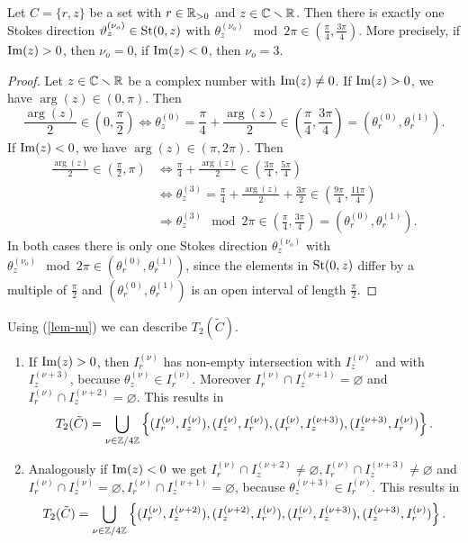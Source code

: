 \begin{lem}\label{lem-nu} Let $C = \{r,z\}$ be a set with $r \in \mathbb{R}_{>0}$ and $z \in \mathbb{C}\smallsetminus \mathbb{R}$. Then there is exactly one Stokes direction $\vartheta_z^{(\nu_o)} \in \operatorname{St}(0,z)$ with $\theta_z^{(\nu_o)}\mod 2 \pi  \in \left( \frac{\pi}{4}, \frac{3\pi}{4} \right)$.
    More precisely, if $\operatorname{Im}(z) > 0$, then $\nu_o = 0$, if $\operatorname{Im}(z)<0$, then  $\nu_o = 3$.
\end{lem}
\begin{proof} Let $z\in \mathbb{C} \smallsetminus \mathbb{R}$ be a complex number with $\operatorname{Im}(z) \neq 0$.
    If $\operatorname{Im}(z)>0$, we have $\arg(z) \in (0,\pi)$. Then 
    \[
    \frac{\arg(z)}{2} \in \left(0, \frac{\pi}{2}\right) \Leftrightarrow \theta_z^{(0)} = \frac{\pi}{4}+\frac{\arg(z)}{2}\in \left(\frac{\pi}{4},\frac{3\pi}{4}\right) = (\theta_r^{(0)}, \theta_r^{(1)}).
    \]
    If $\operatorname{Im}(z)<0$, we have $\arg(z) \in (\pi,2\pi)$. Then 
    \begin{align*}
    \frac{\arg(z)}{2} \in \left(\frac{\pi}{2}, \pi\right) & \Leftrightarrow \frac{\pi}{4}+\frac{\arg(z)}{2}\in \left(\frac{3\pi}{4},\frac{5\pi}{4}\right) \\ &  \Leftrightarrow \theta_z^{(3)}=\frac{\pi}{4}+\frac{\arg(z)}{2} + \frac{3\pi}{2} \in \left(\frac{9\pi}{4},\frac{11\pi}{4}\right) \\ & \Rightarrow  \theta_z^{(3)} \mod 2\pi \in \left(\frac{\pi}{4},\frac{3\pi}{4}\right)= (\theta_r^{(0)}, \theta_r^{(1)}).
    \end{align*}
    In both cases there is only one Stokes direction $\theta_z^{(\nu_o)}$ with $\theta_z^{(\nu_o)} \mod 2\pi \in (\theta_r^{(0)}, \theta_r^{(1)})$, since the elements in $\operatorname{St}(0,z)$ differ by a multiple of $\frac{\pi}{2}$ and $(\theta_r^{(0)}, \theta_r^{(1)})$ is an open interval of length $\frac{\pi}{2}$.
\end{proof}

Using (\ref{lem-nu}) we can describe $T_2(\tilde{C})$.
\begin{enumerate}
    \item If $\operatorname{Im}(z)>0$, then $I_r^{(\nu)}$ has non-empty intersection with $I_z^{(\nu)}$ and with $I_z^{(\nu+3)}$, because $\theta_z^{(\nu)} \in I_r^{(\nu)}$. Moreover $I_r^{(\nu)} \cap I_z^{(\nu+1)}=\varnothing$ and $I_r^{(\nu)}\cap I_z^{(\nu+2)} = \varnothing$. This results in  \[ T_2(\tilde{C}) = \bigcup_{\nu \in \mathbb{Z}/4\mathbb{Z}} \left\{(I_r^{(\nu)},I_z^{(\nu)}),(I_z^{(\nu)}, I_r^{(\nu)}),(I_r^{(\nu)},I_z^{(\nu+3)}), (I_z^{(\nu+3)}, I_r^{(\nu)})\right\}.\]
    \item Analogously if $\operatorname{Im}(z) < 0$ we get $I_r^{(\nu)} \cap I_z^{(\nu+2)} \neq \varnothing, I_r^{(\nu)} \cap I_z^{(\nu+3)} \neq \varnothing$ and $I_r^{(\nu)} \cap I_z^{(\nu)} = \varnothing, I_r^{(\nu)} \cap I_z^{(\nu+1)} = \varnothing$, because $\theta_z^{(\nu+3)} \in I_r^{(\nu)}$. This results in
    \[T_2(\tilde{C}) = \bigcup_{\nu \in \mathbb{Z}/4\mathbb{Z}} \left\{(I_r^{(\nu)},I_z^{(\nu+2)}),(I_z^{(\nu+2)}, I_r^{(\nu)}),(I_r^{(\nu)},I_z^{(\nu+3)}), (I_z^{(\nu+3)}, I_r^{(\nu)})\right\}.\]
\end{enumerate}


